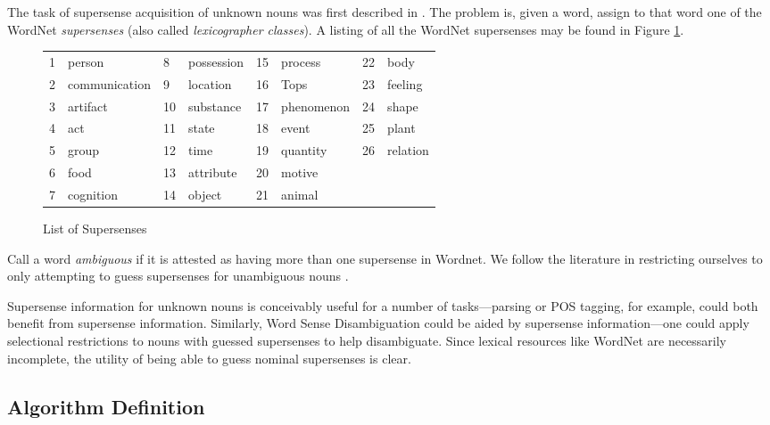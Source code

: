 \documentclass{article}
\begin{document}

The task of supersense acquisition of unknown nouns was first described in \cite{cj}.
The problem is, given a word,  assign to that word one of the WordNet {\it supersenses} (also called {\it lexicographer classes}).
A listing of all the WordNet supersenses may be found in Figure \ref{fig:supersenses}.
\begin{center}
\begin{figure}[hbtp]
\begin{tabular}{llllllll}
1& person & 8& possession&  15& process&  22& body \\
2& communication & 9& location& 16& Tops&  23& feeling \\
3& artifact & 10& substance&  17& phenomenon& 24& shape \\
4& act & 11& state& 18& event&  25& plant \\
5& group & 12& time& 19& quantity&  26& relation \\
6& food & 13&  attribute& 20& motive \\
7& cognition& 14& object& 21& animal \\
\end{tabular}
\caption{List of Supersenses}
\label{fig:supersenses}
\end{figure}
\end{center}

Call a word {\it ambiguous} if it is attested as having more than one supersense in Wordnet.
We follow the literature in restricting ourselves to only attempting to guess supersenses for unambiguous nouns \cite{cj}\cite{curran}.

Supersense information for unknown nouns is conceivably useful for a number of tasks---parsing or POS tagging, for example, could both benefit from supersense information.
Similarly, Word Sense Disambiguation could be aided by supersense information---one could apply selectional restrictions to nouns with guessed supersenses to help disambiguate.
Since lexical resources like WordNet are necessarily incomplete, the utility of being able to guess nominal supersenses is clear.



\subsection{Algorithm Definition}
\end{document}
